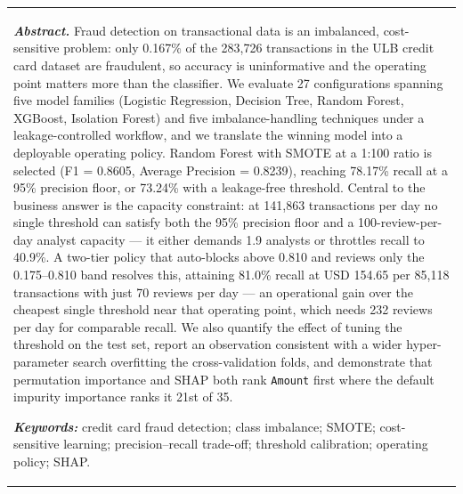 \begin{titlepage}
\begin{center}
\begin{tabular}{rrll}
\end{tabular}
\end{center}

\vspace{0.45cm}

\begin{center}
\begin{tabular}{p{12.4cm}}
\textbf{\textit{Abstract.}} Fraud detection on transactional data is an
imbalanced, cost-sensitive problem: only 0.167\% of the 283{,}726 transactions
in the ULB credit card dataset are fraudulent, so accuracy is uninformative
and the operating point matters more than the classifier. We evaluate 27
configurations spanning five model families (Logistic Regression, Decision
Tree, Random Forest, XGBoost, Isolation Forest) and five imbalance-handling
techniques under a leakage-controlled workflow, and we translate the winning
model into a deployable operating policy. Random Forest with SMOTE at a 1:100
ratio is selected (F1 = 0.8605, Average Precision = 0.8239), reaching 78.17\%
recall at a 95\% precision floor, or 73.24\% with a leakage-free threshold.
Central to the business answer is the capacity constraint: at 141{,}863
transactions per day no single threshold can satisfy both the 95\% precision
floor and a 100-review-per-day analyst capacity --- it either demands 1.9
analysts or throttles recall to 40.9\%. A two-tier policy that auto-blocks
above 0.810 and reviews only the 0.175--0.810 band resolves this, attaining
81.0\% recall at USD 154.65 per 85{,}118 transactions with just 70 reviews per
day --- an operational gain over the cheapest single threshold near that
operating point, which needs 232 reviews per day for comparable recall. We also quantify the effect of tuning the
threshold on the test set, report an observation consistent with a wider hyper-parameter
search overfitting the cross-validation folds, and demonstrate that permutation
importance and SHAP both rank \texttt{Amount} first where the default impurity
importance ranks it 21st of 35.

\vspace{0.25cm}
\textbf{\textit{Keywords:}} credit card fraud detection; class imbalance;
SMOTE; cost-sensitive learning; precision--recall trade-off; threshold
calibration; operating policy; SHAP.
\end{tabular}
\end{center}


\end{titlepage}
